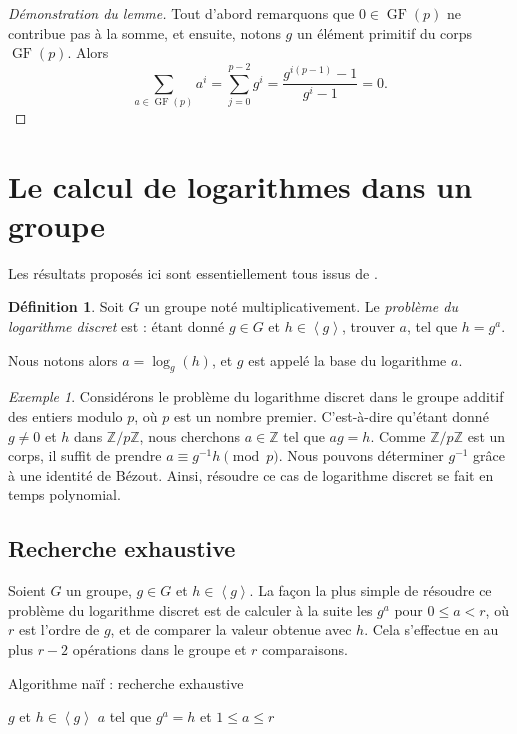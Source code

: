 \documentclass[a4paper, titlepage]{article}
\theoremstyle{definition}
\newtheorem{defi}[theo]{Définition}
\theoremstyle{remark}
\newtheorem{exem}[theo]{Exemple}
\def\Z{\mathbb Z}
\def\gf{\operatorname{GF}}
\def\gen #1{\left\langle#1\right\rangle}
\begin{document}
\begin{proof}[Démonstration du lemme]
Tout d'abord remarquons que $0 \in \gf(p)$ ne contribue pas à la somme, et ensuite, notons $g$ un élément primitif du corps $\gf(p)$. Alors
$$\sum_{a\in\gf(p)} a^i = \sum_{j=0}^{p-2} g^i = \frac{g^{i(p-1)} - 1}{g^{i} - 1} = 0.$$
\end{proof}

\section{Le calcul de logarithmes dans un groupe}\label{logDiscret}

Les résultats proposés ici sont essentiellement tous issus de \cite[section 13 et 14, pp. 246 à 297]{galbraith2012}.

\begin{defi}
Soit $G$ un groupe noté multiplicativement. Le \textit{problème du logarithme discret} est : étant donné $g\in G$ et $h \in \gen{g}$, trouver $a$, tel que $h=g^a$.\end{defi}
Nous notons alors $a=\log_g(h)$, et $g$ est appelé la base du logarithme $a$.


\begin{exem}
Considérons le problème du logarithme discret dans le groupe additif des entiers modulo $p$, où $p$ est un nombre premier. C'est-à-dire qu'étant donné $g \neq 0$ et $h$ dans $\Z/p\Z$, nous cherchons $a \in \Z$ tel que $ag = h$. Comme $\Z/p\Z$ est un corps, il suffit de prendre $a \equiv g^{-1}h \pmod{p}$. Nous pouvons déterminer $g^{-1}$ grâce à une identité de Bézout. Ainsi, résoudre ce cas de logarithme discret se fait en temps polynomial.
\end{exem}

\subsection{Recherche exhaustive}

Soient $G$ un groupe, $g\in G$ et $h \in \gen{g}$. La façon la plus simple de résoudre ce problème du logarithme discret est de calculer à la suite les $g^a$ pour $0 \leqslant a < r$, où $r$ est l'ordre de $g$, et de comparer la valeur obtenue avec $h$. Cela s'effectue en au plus $r - 2$ opérations dans le groupe et $r$ comparaisons.

\begin{algorithm}[H]
\caption{Algorithme naïf : recherche exhaustive}
\label{algoLogDiscretNaif}
\begin{algorithmic}[1]
\REQUIRE $g$ et $h \in \gen{g}$
\ENSURE $a$ tel que $g^a = h$ et $1 \leqslant a \leqslant r$
\ENDWHILE
{}
\end{algorithmic}
\end{algorithm}
\end{document}
